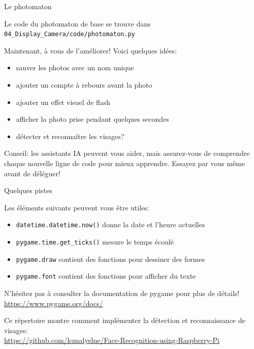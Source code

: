 \documentclass[
aspectratio=169 %
]{beamer}
\begin{document}
\begin{frame}{Le photomaton}

    Le code du photomaton de base se trouve dans\\
    \texttt{04\_Display\_Camera/code/photomaton.py}

    \bigskip
    Maintenant, à vous de l'améliorer! Voici quelques idées:
    \begin{itemize}
        \item sauver les photos avec un nom unique
        \item ajouter un compte à rebours avant la photo
        \item ajouter un effet visuel de flash
        \item afficher la photo prise pendant quelques secondes
        \item détecter et reconnaître les visages?
    \end{itemize}

    \bigskip
    \alert{Conseil}: les assistants IA peuvent vous aider, mais assurez-vous de
    comprendre chaque nouvelle ligne de code pour mieux apprendre. Essayez par
    vous même avant de déléguer!
\end{frame}

\begin{frame}{Quelques pistes}

    Les éléments suivants peuvent vous être utiles:
    \begin{itemize}
        \item \texttt{datetime.datetime.now()} donne la date et l'heure
              actuelles
        \item \texttt{pygame.time.get\_ticks()} mesure le temps écoulé
        \item \texttt{pygame.draw} contient des fonctions pour dessiner des
              formes
        \item \texttt{pygame.font} contient des fonctions pour afficher du texte
    \end{itemize}

    \bigskip
    N'hésitez pas à consulter la documentation de pygame pour plus de
    détails!\\
    \url{https://www.pygame.org/docs/}

    \bigskip
    Ce répertoire montre comment implémenter la détection et reconnaissance de
    visages:\\

    \small{\url{https://github.com/kunalyelne/Face-Recognition-using-Raspberry-Pi}}

\end{frame}
\end{document}
